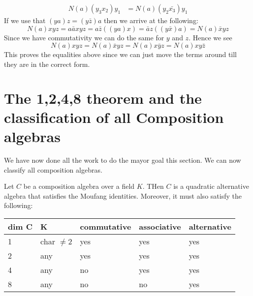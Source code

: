 \documentclass[../Thesis.tex]{subfiles}
\begin{document}
\begin{myproof}
\begin{align*}
N(a)(y_3x_2)y_1 &= N(a)(y_2\bar{x_3})y_1
\end{align*}
If we use that $(ya)z = (y\bar{z})a$ then we arrive at the following:
\begin{equation}
N(a)xyz = a\bar{a}xyz = a\bar{z}((ya)x) = \bar{a}z((y\bar{x})a) = N(a)\bar{x}yz
\end{equation}
Since we have commutativity we can do the same for $y$ and $z$. Hence we see
\begin{equation}
N(a)xyz = N(a)\bar{x}yz = N(a)x\bar{y}z = N(a)xy\bar{z}
\end{equation}
This proves the equalities above since we can just move the terms around till they are in the correct form.
\end{myproof}

\section{The 1,2,4,8 theorem and the classification of all Composition algebras}
We have now done all the work to do the mayor goal this section. We can now classify all composition algebras.
\begin{theorem}
Let $C$ be a composition algebra over a field $K$. THen $C$ is a quadratic alternative algebra that satisfies the Moufang identities. Moreover, it must also satisfy the following:
\begin{tabular}{ l | l| l| l|l}
dim C & K & commutative & associative & alternative \\
\hline
1 & char $\neq 2$ & yes & yes & yes\\
2 & any & yes & yes & yes\\
4 & any & no & yes & yes\\
8 & any & no & no & yes\\
\end{tabular}
\end{theorem}
\end{document}
